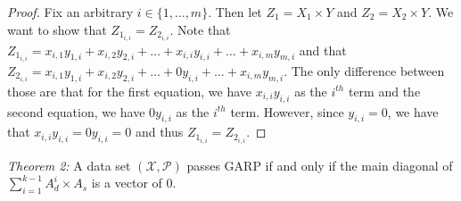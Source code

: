 \documentclass{article} %
\begin{document}
\begin{proof}
Fix an arbitrary $i\in\{1,\ldots,m\}$. Then let $Z_1=X_1\times Y$ and $Z_2=X_2\times Y$. We want to show that $Z_{1_{i,i}}=Z_{2_{i,i}}$. Note that $Z_{1_{i,i}}=x_{i,1}y_{1,i}+x_{i,2}y_{2,i}+\ldots+x_{i,i}y_{i,i}+\ldots+x_{i,m}y_{m,i}$ and that $Z_{2_{i,i}}=x_{i,1}y_{1,i}+x_{i,2}y_{2,i}+\ldots+0y_{i,i}+\ldots+x_{i,m}y_{m,i}$. The only difference between those are that for the first equation, we have $x_{i,i}y_{i,i}$ as the $i^{th}$ term and the second equation, we have $0y_{i,i}$ as the $i^{th}$ term. However, since $y_{i,i}=0$, we have that $x_{i,i}y_{i,i}=0y_{i,i}=0$ and thus $Z_{1_{i,i}}=Z_{2_{i,i}}$.
\end{proof}

\textit{Theorem 2:} A data set $(\mathcal{X},\mathcal{P})$ passes GARP if and only if the main diagonal of $\sum_{i=1}^{k-1}A_{d}^{i}\times A_s$ is a vector of 0.
\end{document}
